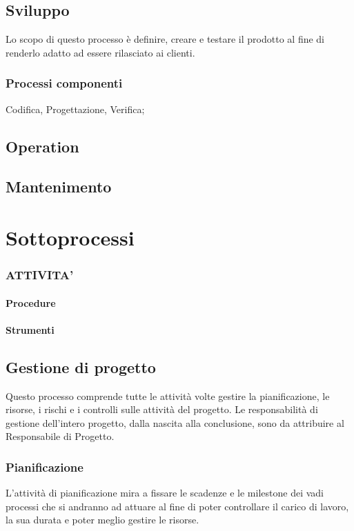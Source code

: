 \subsection{Sviluppo}
Lo scopo di questo processo è definire, creare e testare il prodotto al fine di renderlo adatto ad essere rilasciato ai clienti.
\subsubsection{Processi componenti}
Codifica, Progettazione, Verifica;
\subsection{Operation}
\subsection{Mantenimento}


\section{Sottoprocessi}



\subsubsection{ATTIVITA'}

\paragraph{Procedure}

\paragraph{Strumenti}

\subsection{Gestione di progetto}
Questo processo comprende tutte le attività volte gestire la pianificazione, le risorse, i rischi e i controlli sulle attività del progetto.
Le responsabilità di gestione dell’intero progetto, dalla nascita alla conclusione, sono da attribuire al Responsabile di Progetto.

\subsubsection{Pianificazione}
L'attività di pianificazione mira a fissare le scadenze e le milestone dei vadi processi che si andranno ad attuare al fine di poter controllare il carico di lavoro, la sua durata e poter meglio gestire le risorse.
